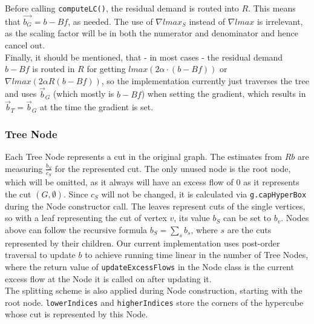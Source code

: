Before calling \texttt{computeLC()}, the residual demand is routed into $R$. This means that $\vec{b_G}=b-Bf$, as needed. The use of $\nabla lmax_S$ instead of $\nabla lmax$ is irrelevant, as the scaling factor will be in both the numerator and denominator and hence cancel out.\\
Finally, it should be mentioned, that - in most cases - the residual demand $b-Bf$ is routed in $R$ for getting $lmax(2\alpha\cdot (b-Bf))$ or $\nabla lmax(2\alpha R(b-Bf))$, so the implementation currently just traverses the tree and uses $\vec{b}_G$ (which mostly is $b-Bf$) when setting the gradient, which results in $\vec{b}_T=\vec{b}_G$ at the time the gradient is set.

\subsubsection{Tree Node}
Each Tree Node represents a cut in the original graph. The estimates from $Rb$ are measuring $\frac{b_S}{c_S}$ for the represented cut. The only unused node is the root node, which will be omitted, as it always will have an excess flow of $0$ as it represents the cut $(G,\emptyset)$. Since $c_S$ will not be changed, it is calculated via \texttt{g.capHyperBox} during the Node constructor call. The leaves represent cuts of the single vertices, so with a leaf representing the cut of vertex $v$, its value $b_S$ can be set to $b_v$. Nodes above can follow the recursive formula $b_S=\sum_sb_s$, where $s$ are the cuts represented by their children. Our current implementation uses post-order traversal to update $b$ to achieve running time linear in the number of Tree Nodes, where the return value of \texttt{updateExcessFlows} in the Node class is the current excess flow at the Node it is called on after updating it.\\
The splitting scheme is also applied during Node construction, starting with the root node. \texttt{lowerIndices} and \texttt{higherIndices} store the corners of the hypercube whose cut is represented by this Node.

